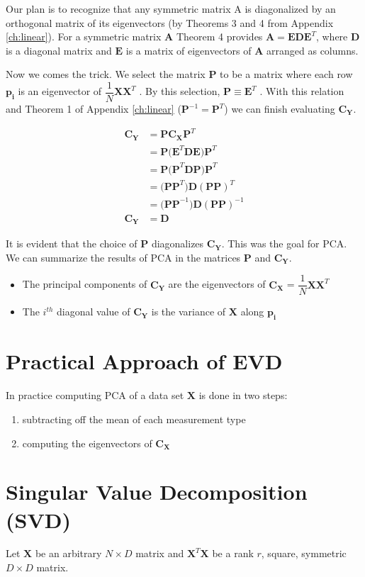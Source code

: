 Our plan is to recognize that any symmetric matrix A is diagonalized by an orthogonal matrix of its eigenvectors (by Theorems 3 and 4 from Appendix \ref{ch:linear}). For a symmetric matrix $\pmb{A}$  Theorem 4 provides $\pmb{A = EDE}^T$, where $\pmb{D}$  is a diagonal matrix and $\pmb{E}$  is a matrix of eigenvectors of $\pmb{A}$  arranged as columns.

Now we comes the trick. We select the matrix $\pmb{P}$  to be a matrix where each row $\pmb{p_i}$  is an eigenvector of $\dfrac{1}{N}\pmb{XX}^T$ . By this selection, $\pmb{P \equiv E}^T$ . With this relation and Theorem 1 of Appendix \ref{ch:linear} ($\pmb{P}^{-1} = \pmb{P}^T$) we can finish evaluating $\pmb{C_Y}$.

\begin{align*}
\pmb{C_Y} &= \pmb{PC_XP}^T\\
&= \pmb{P(E}^T\pmb{DE)P}^T\\
&= \pmb{P(P}^T\pmb{DP)P}^T\\
&= \pmb{(PP}^T)\pmb{D(PP)}^T\\
&= \pmb{(PP}^{-1})\pmb{D(PP)}^{-1}\\
\pmb{C_Y} &= \pmb{D}
\end{align*}

It is evident that the choice of $\pmb{P}$ diagonalizes $\pmb{C_Y}$. This was the goal for PCA. We can summarize the results of PCA in the matrices $\pmb{P}$ and $\pmb{C_Y}$.

\begin{itemize}
\item The principal components of $\pmb{C_Y}$ are the eigenvectors of $\pmb{C_X}$ = $\dfrac{1}{N}\pmb{XX}^T$
\item The $i^{th}$ diagonal value of $\pmb{C_Y}$ is the variance of $\pmb{X}$ along $\pmb{p_i}$
\end{itemize}

\section{Practical Approach of EVD}
In practice computing PCA of a data set $\pmb{X}$ is done in two steps:
\begin{enumerate}
\item subtracting off the mean of each measurement type 
\item computing the eigenvectors of $\pmb{C_X}$
\end{enumerate}
\section{Singular Value Decomposition (SVD)}
Let $\textbf{X}$ be an arbitrary $N \times D$ matrix and $\pmb{X}^T\pmb{X}$ be a rank $r$, square, symmetric $D \times D$ matrix. 

